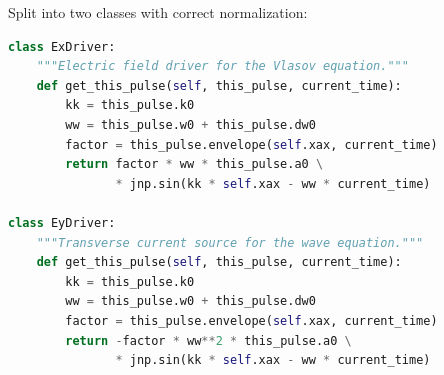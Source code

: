 \documentclass[11pt]{article}
\begin{document}
Split into two classes with correct normalization:
\begin{lstlisting}[language=Python]
class ExDriver:
    """Electric field driver for the Vlasov equation."""
    def get_this_pulse(self, this_pulse, current_time):
        kk = this_pulse.k0
        ww = this_pulse.w0 + this_pulse.dw0
        factor = this_pulse.envelope(self.xax, current_time)
        return factor * ww * this_pulse.a0 \
               * jnp.sin(kk * self.xax - ww * current_time)

class EyDriver:
    """Transverse current source for the wave equation."""
    def get_this_pulse(self, this_pulse, current_time):
        kk = this_pulse.k0
        ww = this_pulse.w0 + this_pulse.dw0
        factor = this_pulse.envelope(self.xax, current_time)
        return -factor * ww**2 * this_pulse.a0 \
               * jnp.sin(kk * self.xax - ww * current_time)
\end{lstlisting}
\end{document}
